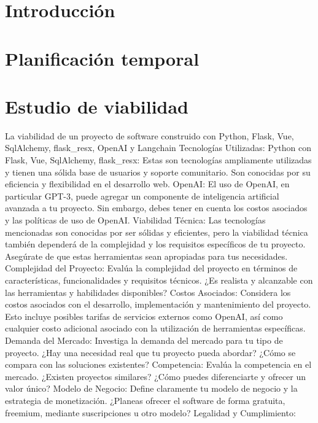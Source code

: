 
\section{Introducción}

\section{Planificación temporal}

\section{Estudio de viabilidad}
La viabilidad de un proyecto de software construido con Python, Flask, Vue, 
SqlAlchemy, flask\_resx, OpenAI y Langchain
Tecnologías Utilizadas:
Python con Flask, Vue, SqlAlchemy, flask\_resx: Estas son tecnologías ampliamente utilizadas y 
tienen una sólida base de usuarios y soporte comunitario. Son conocidas por su eficiencia y 
flexibilidad en el desarrollo web.
OpenAI: El uso de OpenAI, en particular GPT-3, puede agregar un componente de 
inteligencia artificial avanzada a tu proyecto. Sin embargo, debes tener en 
cuenta los costos asociados y las políticas de uso de OpenAI.
Viabilidad Técnica:
Las tecnologías mencionadas son conocidas por ser sólidas y eficientes, 
pero la viabilidad técnica también dependerá de la complejidad y los requisitos 
específicos de tu proyecto. Asegúrate de que estas herramientas sean apropiadas para tus necesidades.
Complejidad del Proyecto:
Evalúa la complejidad del proyecto en términos de características, funcionalidades y 
requisitos técnicos. ¿Es realista y alcanzable con las herramientas y habilidades disponibles?
Costos Asociados:
Considera los costos asociados con el desarrollo, implementación y 
mantenimiento del proyecto. Esto incluye posibles tarifas de servicios externos como OpenAI, 
así como cualquier costo adicional asociado con la utilización de herramientas específicas.
Demanda del Mercado:
Investiga la demanda del mercado para tu tipo de proyecto. 
¿Hay una necesidad real que tu proyecto pueda abordar?
 ¿Cómo se compara con las soluciones existentes?
Competencia:
Evalúa la competencia en el mercado. ¿Existen proyectos similares? ¿Cómo puedes diferenciarte y ofrecer un valor único?
Modelo de Negocio:
Define claramente tu modelo de negocio y la estrategia de monetización. ¿Planeas ofrecer el software de forma gratuita, freemium, mediante suscripciones u otro modelo?
Legalidad y Cumplimiento:
